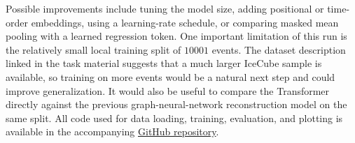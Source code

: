 Possible improvements include tuning the model size, adding positional or time-order embeddings, using a learning-rate schedule, or comparing masked mean pooling with a learned regression token.
One important limitation of this run is the relatively small local training split of \(10001\) events.
The dataset description linked in the task material suggests that a much larger IceCube sample is available, so training on more events would be a natural next step and could improve generalization.
It would also be useful to compare the Transformer directly against the previous graph-neural-network reconstruction model on the same split.
All code used for data loading, training, evaluation, and plotting is available in the accompanying
\href{https://github.com/AkramAki/Advanced_DeepLearning_Seminar}{GitHub repository}.

\printbibliography


